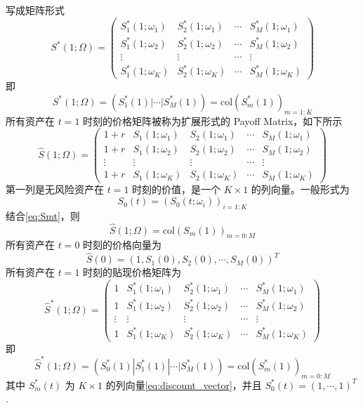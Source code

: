 写成矩阵形式
\[
S^*(1;\Omega)=\begin{pmatrix}
    S_1^*(1;\omega_1) & S_2^*(1;\omega_1) & \cdots & S_M^*(1;\omega_1)\\
    S_1^*(1;\omega_2) & S_2^*(1;\omega_2) & \cdots & S_M^*(1;\omega_2)\\
    \vdots & \vdots & \cdots & \vdots\\
    S_1^*(1;\omega_K) & S_2^*(1;\omega_K) & \cdots & S_M^*(1;\omega_K)
\end{pmatrix}
\]
即
\begin{equation}
S^*(1;\Omega)=(S_1^*(1)|\cdots |S_M^*(1))=\text{col}(S_m^*(1))_{m=1:K}
\label{eq:discount_payoff}
\end{equation}
所有资产在 $t=1$ 时刻的价格矩阵被称为扩展形式的 Payoff Matrix，如下所示
\[
\hat{S}(1;\Omega)=\begin{pmatrix}
    1+r & S_1(1;\omega_1) & S_2(1;\omega_1) & \cdots & S_M(1;\omega_1)\\
    1+r & S_1(1;\omega_2) & S_2(1;\omega_2) & \cdots & S_M(1;\omega_2)\\
    \vdots & \vdots & \vdots & \cdots & \vdots\\
    1+r & S_1(1;\omega_K) & S_2(1;\omega_K) & \cdots & S_M(1;\omega_K)
\end{pmatrix}
\]
第一列是无风险资产在 $t=1$ 时刻的价值，是一个 $K\times 1$ 的列向量。一般形式为
\begin{equation}
S_0(t)=(S_0(t;\omega_i))_{i=1:K}
\label{eq:S0t}
\end{equation}
结合\eqref{eq:Smt}，则
\begin{equation}
\hat{S}(1;\Omega)=\text{col}(S_m(1))_{m=0:M}
\label{eq:extend_payoff}
\end{equation}
所有资产在 $t=0$ 时刻的价格向量为
\begin{equation}
\hat{S}(0)=(1,S_1(0),S_2(0),\cdots,S_M(0))^T
\label{eq:extend_S0_vec}
\end{equation}
所有资产在 $t=1$ 时刻的贴现价格矩阵为
\[
\hat{S}^*(1;\Omega)=\begin{pmatrix}
    1 & S_1^*(1;\omega_1) & S_2^*(1;\omega_1) & \cdots & S_M^*(1;\omega_1)\\
    1 & S_1^*(1;\omega_2) & S_2^*(1;\omega_2) & \cdots & S_M^*(1;\omega_2)\\
    \vdots & \vdots & \vdots & \cdots & \vdots\\
    1 & S_1^*(1;\omega_K) & S_2^*(1;\omega_K) & \cdots & S_M^*(1;\omega_K)
\end{pmatrix}
\]
即
\begin{equation}
\hat{S}^*(1;\Omega)=(S_0^*(1)|S_1^*(1)|\cdots |S_M^*(1))=\text{col}(S_m^*(1))_{m=0:M}
\label{eq:extend_discount_payoff}
\end{equation}
其中 $S_m^*(t)$ 为 $K\times 1$ 的列向量\eqref{eq:discount_vector}，并且 $S_0^*(t)=(1,\cdots,1)^T$.

